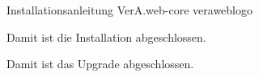 \documentclass{tarentanleitung}
\begin{document}

\upgradeanleitungfalse
\tarentanleitung
 {Installationsanleitung VerA.web-core}
 {\vwiaverspo}{\vwiaversfassungnr}{\vwiaversfassungmonat}{\vwiaversfassungjahr}{veraweblogo}







Damit ist die Installation abgeschlossen.



Damit ist das Upgrade abgeschlossen.


\end{document}
